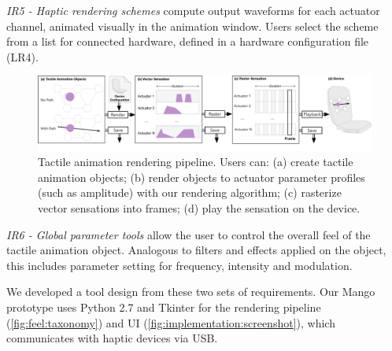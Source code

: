 \emph{IR5 - Haptic rendering schemes}
compute output waveforms for each %
actuator channel, animated %
visually in the animation window. 
Users select the %
scheme from a list %
for connected hardware, %
defined in a hardware configuration file (LR4).
 \begin{figure}[t] %
   \centering
   \includegraphics[width=1.0\textwidth]{images/Fig2-FeelTaxonomy-2015-04-14-1332}%
   \caption{Tactile animation rendering pipeline. Users can: (a) create tactile animation objects; (b) render objects to actuator parameter profiles (such as amplitude) with our rendering algorithm; (c) rasterize vector sensations into frames; (d) play the sensation on the device.}
   \label{fig:feel:taxonomy}
\end{figure}

\emph{IR6 - Global parameter tools} allow the user to control the overall feel of the tactile animation object.
Analogous to filters and effects applied on the object, this includes parameter setting for frequency, intensity and modulation.

We developed a tool design from these two sets of requirements. Our Mango prototype uses
Python 2.7 and Tkinter for 
the rendering pipeline (\autoref{fig:feel:taxonomy}) and UI (\autoref{fig:implementation:screenshot}), which 
communicates with haptic devices via USB. %



